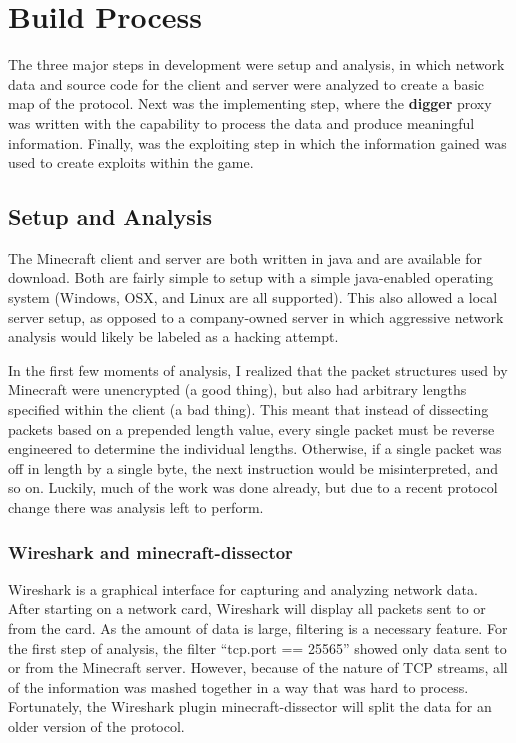 \documentclass[12pt]{article}
\begin{document}
\section{Build Process}
The three major steps in development were setup and analysis, in which network data and source code for the client and server were analyzed to create a basic map of the protocol. Next was the implementing step, where the \textbf{digger} proxy was written with the capability to process the data and produce meaningful information. Finally, was the exploiting step in which the information gained was used to create exploits within the game.

\subsection{Setup and Analysis}
The Minecraft client and server are both written in java and are available for download. Both are fairly simple to setup with a simple java-enabled operating system (Windows, OSX, and Linux are all supported).  This also allowed a local server setup, as opposed to a company-owned server in which aggressive network analysis would likely be labeled as a hacking attempt.

In the first few moments of analysis, I realized that the packet structures used by Minecraft were unencrypted (a good thing), but also had arbitrary lengths specified within the client (a bad thing). This meant that instead of dissecting packets based on a prepended length value, every single packet must be reverse engineered to determine the individual lengths. Otherwise, if a single packet was off in length by a single byte, the next instruction would be misinterpreted, and so on. Luckily, much of the work was done already, but due to a recent protocol change there was analysis left to perform.

\subsubsection{Wireshark and minecraft-dissector}
Wireshark is a graphical interface for capturing and analyzing network data. After starting on a network card, Wireshark will display all packets sent to or from the card. As the amount of data is large, filtering is a necessary feature. For the first step of analysis, the filter ``tcp.port == 25565'' showed only data sent to or from the Minecraft server. However, because of the nature of TCP streams, all of the information was mashed together in a way that was hard to process. Fortunately, the Wireshark plugin minecraft-dissector will split the data for an older version of the protocol.
\end{document}
